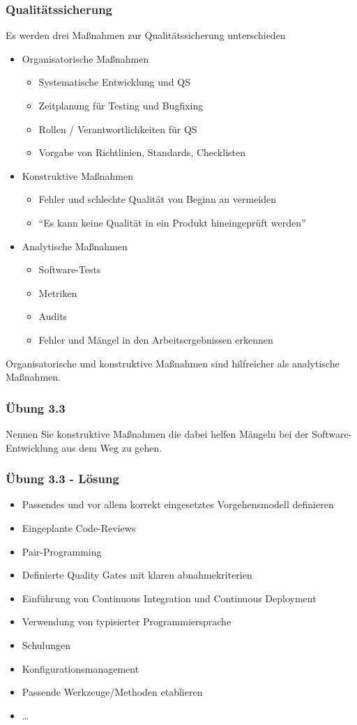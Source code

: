 \begin{frame}
\frametitle{Qualitätssicherung}
	Es werden drei Maßnahmen zur Qualitätssicherung unterschieden
	\begin{itemize}
		\item Organisatorische Maßnahmen
					\begin{itemize}
						\item Systematische Entwicklung und QS
						\item Zeitplanung für Testing und Bugfixing
						\item Rollen / Verantwortlichkeiten für QS
						\item Vorgabe von Richtlinien, Standards, Checklisten
					\end{itemize}
		\item Konstruktive Maßnahmen
					\begin{itemize}
						\item Fehler und schlechte Qualität von Beginn an vermeiden
						\item ``Es kann keine Qualität in ein Produkt hineingeprüft werden''
					\end{itemize}
		\item Analytische Maßnahmen
					\begin{itemize}
						\item Software-Tests
						\item Metriken
						\item Audits
						\item Fehler und Mängel in den Arbeitsergebnissen erkennen
					\end{itemize}
	\end{itemize}
	Organisatorische und konstruktive Maßnahmen sind hilfreicher als analytische Maßnahmen.
\end{frame}

\begin{frame}
\frametitle{Übung 3.3}
	Nennen Sie konstruktive Maßnahmen die dabei helfen Mängeln bei der Software-Entwicklung aus dem
	Weg zu gehen.
\end{frame}

\ifloesung
\begin{frame}
\frametitle{Übung 3.3 - Lösung}
	\begin{itemize}
		\item Passendes und vor allem korrekt eingesetztes Vorgehensmodell definieren
		\item Eingeplante Code-Reviews
		\item Pair-Programming
		\item Definierte Quality Gates mit klaren abnahmekriterien
		\item Einführung von Continuous Integration und Continuous Deployment
		\item Verwendung von typisierter Programmiersprache
		\item Schulungen
		\item Konfigurationsmanagement
		\item Passende Werkzeuge/Methoden etablieren
		\item \ldots
	\end{itemize}
\end{frame}
\fi

